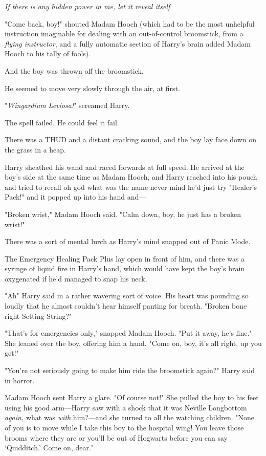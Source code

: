 \emph{If there is any hidden power in me, let it reveal itself }

"Come back, boy!" shouted Madam Hooch (which had to be the most unhelpful
instruction imaginable for dealing with an out-of-control broomstick, from a
\emph{flying instructor}, and a fully automatic section of Harry's brain added
Madam Hooch to his tally of fools).

And the boy was thrown off the broomstick.

He seemed to move very slowly through the air, at first.

"\emph{Wingardium Leviosa!}" screamed Harry.

The spell failed. He could feel it fail.

There was a THUD and a distant cracking sound, and the boy lay face down on the
grass in a heap.

Harry sheathed his wand and raced forwards at full speed. He arrived at the
boy's side at the same time as Madam Hooch, and Harry reached into his pouch
and tried to recall oh god what was the name never mind he'd just try "Healer's
Pack!" and it popped up into his hand and\mbox{---}

"Broken wrist," Madam Hooch said. "Calm down, boy, he just has a broken wrist!"

There was a sort of mental lurch as Harry's mind snapped out of Panic Mode.

The Emergency Healing Pack Plus lay open in front of him, and there was a
syringe of liquid fire in Harry's hand, which would have kept the boy's brain
oxygenated if he'd managed to snap his neck.

"Ah{\el}" Harry said in a rather wavering sort of voice. His heart was
pounding so loudly that he almost couldn't hear himself panting for breath.
"Broken bone{\el} right{\el} Setting String?"

"That's for emergencies only," snapped Madam Hooch. "Put it away, he's fine."
She leaned over the boy, offering him a hand. "Come on, boy, it's all right, up
you get!"

"You're not seriously going to make him ride the broomstick again?" Harry said
in horror.

Madam Hooch sent Harry a glare. "Of course not!" She pulled the boy to his feet
using his good arm---Harry saw with a shock that it was Neville Longbottom
\emph{again,} what was \emph{with} him?---and she turned to all the watching
children. "None of you is to move while I take this boy to the hospital wing!
You leave those brooms where they are or you'll be out of Hogwarts before you
can say `Quidditch.' Come on, dear."

